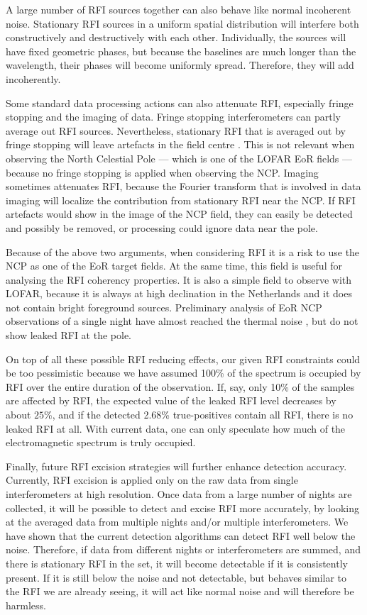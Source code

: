 \documentclass[useAMS,usenatbib]{mn2e}
\begin{document}
A large number of RFI sources together can also behave like normal incoherent noise. Stationary RFI sources in a uniform spatial distribution will interfere both constructively and destructively with each other. Individually, the sources will have fixed geometric phases, but because the baselines are much longer than the wavelength, their phases will become uniformly spread. Therefore, they will add incoherently.

Some standard data processing actions can also attenuate RFI, especially fringe stopping and the imaging of data. Fringe stopping interferometers can partly average out RFI sources. Nevertheless, stationary RFI that is averaged out by fringe stopping will leave artefacts in the field centre \citep{post-correlation-filtering}. This is not relevant when observing the North Celestial Pole --- which is one of the LOFAR EoR fields --- because no fringe stopping is applied when observing the NCP. Imaging sometimes attenuates RFI, because the Fourier transform that is involved in data imaging will localize the contribution from stationary RFI near the NCP. If RFI artefacts would show in the image of the NCP field, they can easily be detected and possibly be removed, or processing could ignore data near the pole.

Because of the above two arguments, when considering RFI it is a risk to use the NCP as one of the EoR target fields. At the same time, this field is useful for analysing the RFI coherency properties. It is also a simple field to observe with LOFAR, because it is always at high declination in the Netherlands and it does not contain bright foreground sources. Preliminary analysis of EoR NCP observations of a single night have almost reached the thermal noise \citep{ncp-eor-yatawatta}, but do not show leaked RFI at the pole.

On top of all these possible RFI reducing effects, our given RFI constraints could be too pessimistic because we have assumed 100\% of the spectrum is occupied by RFI over the entire duration of the observation. If, say, only 10\% of the samples are affected by RFI, the expected value of the leaked RFI level decreases by about $25$\%, and if the detected 2.68\% true-positives contain all RFI, there is no leaked RFI at all. With current data, one can only speculate how much of the electromagnetic spectrum is truly occupied.

Finally, future RFI excision strategies will further enhance detection accuracy. Currently, RFI excision is applied only on the raw data from single interferometers at high resolution. Once data from a large number of nights are collected, it will be possible to detect and excise RFI more accurately, by looking at the averaged data from multiple nights and/or multiple interferometers. We have shown that the current detection algorithms can detect RFI well below the noise. Therefore, if data from different nights or interferometers are summed, and there is stationary RFI in the set, it will become detectable if it is consistently present. If it is still below the noise and not detectable, but behaves similar to the RFI we are already seeing, it will act like normal noise and will therefore be harmless.
\end{document}
